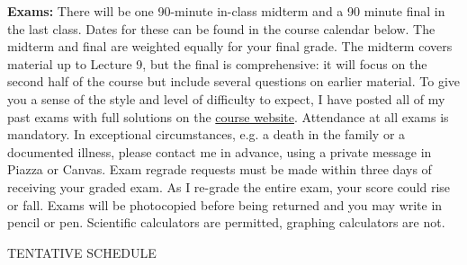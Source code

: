 \documentclass[11pt, letterpaper]{article}
\begin{document}
\noindent \textbf{Exams:} There will be one 90-minute in-class midterm and a 90 minute final in the last class. Dates
for these can be found in the course calendar below. The midterm and final are weighted equally
for your final grade. The midterm covers material up to Lecture 9, but the final is comprehensive:
it will focus on the second half of the course but include several questions on earlier material.
To give you a sense of the style and level of difficulty to expect, I have posted all of my past exams with full solutions on the \href{http://ditraglia.com/Econ103Public}{course website}. Attendance at
all exams is mandatory. In exceptional circumstances, e.g. a death in the family or a documented illness, please contact me in advance, using a private message in Piazza or Canvas. Exam regrade
requests must be made within three days of receiving your graded exam. As I re-grade the entire
exam, your score could rise or fall. Exams will be photocopied before being returned and you may
write in pencil or pen. Scientific calculators are permitted, graphing calculators are not.

\medskip

\begin{center}
\small
TENTATIVE SCHEDULE
\end{center}
\end{document}
